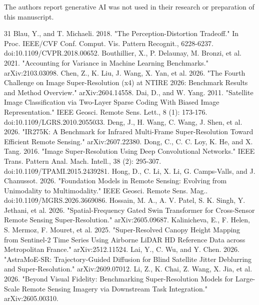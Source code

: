 \documentclass{interact}
\begin{document}
The authors report generative AI was not used in their research or preparation of this manuscript.

\begin{thebibliography}{31}
Blau, Y., and T. Michaeli. 2018. "The Perception-Distortion Tradeoff." In Proc. IEEE/CVF Conf. Comput. Vis. Pattern Recognit., 6228-6237. doi:10.1109/CVPR.2018.00652.
Bouthillier, X., P. Delaunay, M. Bronzi, et al. 2021. "Accounting for Variance in Machine Learning Benchmarks." arXiv:2103.03098.
Chen, Z., K. Liu, J. Wang, X. Yan, et al. 2026. "The Fourth Challenge on Image Super-Resolution (x4) at NTIRE 2026: Benchmark Results and Method Overview." arXiv:2604.14558.
Dai, D., and W. Yang. 2011. "Satellite Image Classification via Two-Layer Sparse Coding With Biased Image Representation." IEEE Geosci. Remote Sens. Lett., 8 (1): 173-176. doi:10.1109/LGRS.2010.2055033.
Deng, J., H. Wang, C. Wang, J. Shen, et al. 2026. "IR275K: A Benchmark for Infrared Multi-Frame Super-Resolution Toward Efficient Remote Sensing." arXiv:2607.22380.
Dong, C., C. C. Loy, K. He, and X. Tang. 2016. "Image Super-Resolution Using Deep Convolutional Networks." IEEE Trans. Pattern Anal. Mach. Intell., 38 (2): 295-307. doi:10.1109/TPAMI.2015.2439281.
Hong, D., C. Li, X. Li, G. Camps-Valls, and J. Chanussot. 2026. "Foundation Models in Remote Sensing: Evolving from Unimodality to Multimodality." IEEE Geosci. Remote Sens. Mag.. doi:10.1109/MGRS.2026.3669086.
Hossain, M. A., A. V. Patel, S. K. Singh, Y. Jethani, et al. 2026. "Spatial-Frequency Gated Swin Transformer for Cross-Sensor Remote Sensing Super-Resolution." arXiv:2605.09687.
Kalinicheva, E., F. Helen, S. Mermoz, F. Mouret, et al. 2025. "Super-Resolved Canopy Height Mapping from Sentinel-2 Time Series Using Airborne LiDAR HD Reference Data across Metropolitan France." arXiv:2512.11524.
Lai, Y., C. Wu, and Y. Chen. 2026. "AstraMoE-SR: Trajectory-Guided Diffusion for Blind Satellite Jitter Deblurring and Super-Resolution." arXiv:2609.07012.
Li, Z., K. Chai, Z. Wang, X. Jia, et al. 2026. "Beyond Visual Fidelity: Benchmarking Super-Resolution Models for Large-Scale Remote Sensing Imagery via Downstream Task Integration." arXiv:2605.00310.

\end{thebibliography}
\end{document}
